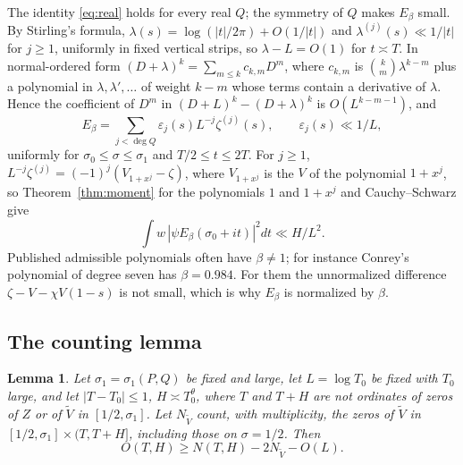 \documentclass[11pt]{article}
\newtheorem{lemma}[theorem]{Lemma}
\theoremstyle{remark}
\newcommand{\Vt}{\widetilde V}
\begin{document}
The identity \eqref{eq:real} holds for every real $Q$; the symmetry of $Q$
makes $E_\beta$ small. By Stirling's formula, $\lambda(s)=\log(|t|/2\pi)+
O(1/|t|)$ and $\lambda^{(j)}(s)\ll1/|t|$ for $j\ge1$, uniformly in fixed
vertical strips, so $\lambda-L=O(1)$ for $t\asymp T$. In normal-ordered form
$(D+\lambda)^k=\sum_{m\le k}c_{k,m}D^m$, where $c_{k,m}$ is
$\binom km\lambda^{k-m}$ plus a polynomial in $\lambda,\lambda',\dots$ of
weight $k-m$ whose terms contain a derivative of $\lambda$. Hence the
coefficient of $D^m$ in $(D+L)^k-(D+\lambda)^k$ is $O(L^{k-m-1})$, and
\begin{equation}\label{eq:Esize}
 E_\beta=\sum_{j<\deg Q}\varepsilon_j(s)L^{-j}\zeta^{(j)}(s),\qquad
 \varepsilon_j(s)\ll1/L,
\end{equation}
uniformly for $\sigma_0\le\sigma\le\sigma_1$ and $T/2\le t\le2T$. For $j\ge1$,
$L^{-j}\zeta^{(j)}=(-1)^j(V_{1+x^j}-\zeta)$, where $V_{1+x^j}$ is the $V$ of
the polynomial $1+x^j$, so Theorem~\ref{thm:moment} for the polynomials $1$
and $1+x^j$ and Cauchy--Schwarz give
\begin{equation}\label{eq:Emean}
 \int w\,|\psi E_\beta(\sigma_0+it)|^2dt\ll H/L^2 .
\end{equation}
Published admissible polynomials often have $\beta\ne1$; for instance
Conrey's polynomial of degree seven has $\beta=0.984$. For them the
unnormalized difference $\zeta-V-\chi V(1-s)$ is not small, which is why
$E_\beta$ is normalized by $\beta$.

\subsection{The counting lemma}

\begin{lemma}\label{lem:count}
Let $\sigma_1=\sigma_1(P,Q)$ be fixed and large, let $L=\log T_0$ be fixed with
$T_0$ large, and let $|T-T_0|\le1$, $H\asymp T_0^\theta$, where $T$ and $T+H$
are not ordinates of zeros of $Z$ or of $\Vt$ in $[1/2,\sigma_1]$. Let
$N_{\Vt}$ count, with multiplicity, the zeros of $\Vt$ in
$[1/2,\sigma_1]\times(T,T+H]$, including those on $\sigma=1/2$. Then
\[
 O(T,H)\ge N(T,H)-2N_{\Vt}-O(L).
\]
\end{lemma}
\end{document}
